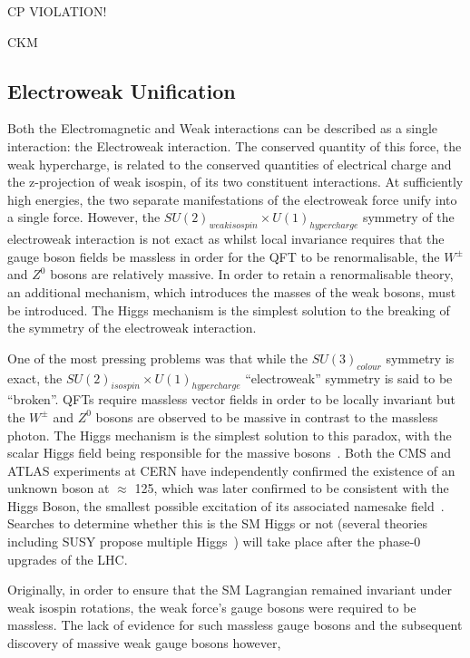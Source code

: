 CP VIOLATION!	

CKM

\subsection{Electroweak Unification}\label{subsec:electroweak}

Both the Electromagnetic and Weak interactions can be described as a single interaction: the Electroweak interaction. 
The conserved quantity of this force, the weak hypercharge, is related to the conserved quantities of electrical charge and the z-projection of weak isospin, of its two constituent interactions. 
At sufficiently high energies, the two separate manifestations of the electroweak force unify into a single force. 
However, the $SU(2)_{weak isospin} \times U(1)_{hypercharge}$ symmetry of the electroweak interaction is not exact as whilst local invariance requires that the gauge boson fields be massless in order for the QFT to be renormalisable, the $W^{\pm}$ and $Z^{0}$ bosons are relatively massive. 
In order to retain a renormalisable theory, an additional mechanism, which introduces the masses of the weak bosons, must be introduced. 
The Higgs mechanism is the simplest solution to the breaking of the symmetry of the electroweak interaction\cite{LagrangiansSM}. 

One of the most pressing problems was that while the $SU(3)_{colour}$ symmetry is exact, the $SU(2)_{isospin} \times U(1)_{hypercharge}$ ``electroweak'' symmetry is said to be ``broken''. 
QFTs require massless vector fields in order to be locally invariant but the $W^{\pm}$ and $Z^{0}$ bosons are observed to be massive in contrast to the massless photon. 
The Higgs mechanism is the simplest solution to this paradox, with the scalar Higgs field being responsible for the massive bosons~\cite{oldcms}. 
Both the CMS and ATLAS experiments at CERN have independently confirmed the existence of an unknown boson at $\approx$ 125\GeV, which was later confirmed to be consistent with the Higgs Boson, the smallest possible excitation of its associated namesake field~\cite{HiggsCMS,HiggsATLAS}. 
Searches to determine whether this is the SM Higgs or not (several theories including SUSY propose multiple Higgs~\cite{Khalil:2003vd,Gianotti:2002xx}) will take place after the phase-0 upgrades of the LHC. 


Originally, in order to ensure that the SM Lagrangian remained invariant under weak isospin rotations, the weak force's gauge bosons were required to be massless.
The lack of evidence for such massless gauge bosons and the subsequent discovery of massive weak gauge bosons however, 


